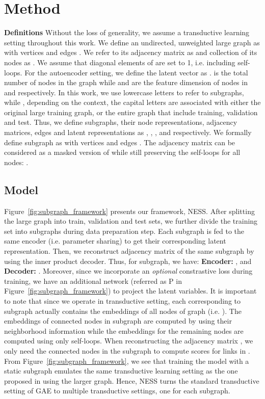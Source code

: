 \documentclass{article}
\begin{document}
\section{Method}

\textbf{Definitions} Without the loss of generality, we assume a transductive learning setting throughout this work. We define an undirected, unweighted large graph as  with vertices  and edges . We refer to its adjacency matrix as  and collection of its nodes as . We assume that diagonal elements of  are set to 1, i.e. including self-loops. For the autoencoder setting, we define the latent vector as .  is the total number of nodes in the graph while  and  are the feature dimension of nodes in  and  respectively. In this work, we use lowercase letters to refer to subgraphs, while , depending on the context, the capital letters are associated with either the original large training graph, or the entire graph that include training, validation and test. Thus, we define  subgraphs, their node representations, adjacency matrices, edges and latent representations as , , ,  and   respectively. We formally define  subgraph as  with vertices  and edges . The adjacency matrix  can be considered as a masked version of  while still preserving the self-loops for all nodes: .




\subsection{Model} 
Figure~\ref{fig:subgraph_framework} presents our framework, NESS. After splitting the large graph into train, validation and test sets, we further divide the training set into subgraphs during data preparation step. Each subgraph is fed to the same encoder (i.e. parameter sharing) to get their corresponding latent representation. Then, we reconstruct adjacency matrix of the same subgraph by using the inner product decoder. Thus, for  subgraph, we have: \textbf{Encoder:} , and \textbf{Decoder:} . Moreover, since we incorporate an \textit{optional} constrastive loss during training, we have an additional network (referred as P in Figure~\ref{fig:subgraph_framework}) to project the latent variables. It is important to note that since we operate in transductive setting, each  corresponding to subgraph  actually contains the embeddings of all  nodes of graph  (i.e. ). The embeddings of connected nodes in subgraph  are computed by using their neighborhood information while the embeddings for the remaining nodes are computed using only self-loops. When reconstructing the adjacency matrix , we only need the connected nodes in the subgraph  to compute scores for links in . From Figure~\ref{fig:subgraph_framework}, we see that training the model with a static subgraph emulates the same transductive learning setting as the one proposed in \citep{kipf2016variational} using the larger graph. Hence, NESS turns the standard transductive setting of GAE to multiple transductive settings, one for each subgraph.
\end{document}

